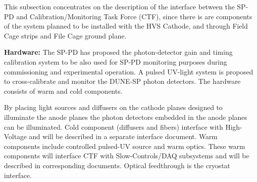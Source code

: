 




This subsection concentrates on the description of the interface between the SP-PD and Calibration/Monitoring Task Force (CTF), since there is are components of the system planned to be installed with the HVS Cathode, and through Field Cage strips and File Cage ground plane.

\textbf{Hardware:} The SP-PD has proposed the photon-detector gain and timing calibration system to be also used for SP-PD monitoring purposes during commissioning and experimental operation. A pulsed UV-light system is proposed to cross-calibrate and monitor the DUNE-SP photon detectors. The hardware consists of warm and cold components. 

By placing light sources and diffusers on the cathode planes designed to illuminate the anode planes the photon detectors embedded in the anode planes can be illuminated. Cold component (diffusers and fibers) interface with High-Voltage and will be described in a separate interface document. Warm components include controlled pulsed-UV source and warm optics. These warm components will interface CTF with Slow-Controls/DAQ subsystems and will be described in corresponding documents. Optical feedthrough is the cryostat interface. 

